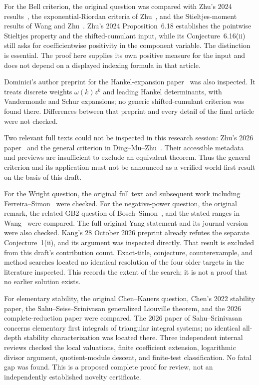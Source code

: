 \documentclass[11pt,a4paper]{article}
\theoremstyle{definition}
\theoremstyle{remark}
\numberwithin{equation}{section}
\begin{document}
For the Bell criterion, the original question was compared with
Zhu's 2024 results~\cite{Zhu2024}, the exponential-Riordan criteria of
Zhu~\cite{Zhu2021}, and the Stieltjes-moment results of Wang and
Zhu~\cite{WangZhu2016}. Zhu's 2024 Proposition~6.18 establishes the
pointwise Stieltjes property and the shifted-cumulant input, while its
Conjecture~6.16(ii) still asks for coefficientwise positivity in the
component variable. The distinction is essential. The proof here supplies
its own positive measure for the input and does not depend on a displayed
indexing formula in that article.

Dominici's author preprint for the Hankel-expansion
paper~\cite{Dominici2020} was also inspected. It treats discrete weights
$\omega(k)z^k$ and leading Hankel determinants, with Vandermonde and Schur
expansions; no generic shifted-cumulant criterion was found there. Differences
between that preprint and every detail of the final article were not checked.

Two relevant full texts could not be inspected in this research session:
Zhu's 2026 paper~\cite{Zhu2026} and the general criterion in
Ding--Mu--Zhu~\cite{DingMuZhu2026}. Their accessible metadata and previews are
insufficient to exclude an equivalent theorem. Thus the general criterion
and its application must not be announced as a verified world-first result
on the basis of this draft.

For the Wright question, the original full text and subsequent work
including Ferreira--Simon~\cite{FerreiraSimon2025} were checked. For the
negative-power question, the original remark, the related GB2 question of
Bosch--Simon~\cite{BoschSimon2015}, and the stated ranges in
Wang~\cite{Wang2024,Wang2026} were compared. The full original Yang
statement and its journal version were also checked. Kang's 28 October
2026 preprint \cite{Kang2026} already refutes the separate
Conjecture~1(ii), and its argument was inspected directly. That result
is excluded from this draft's contribution count. Exact-title,
conjecture, counterexample, and method searches located no identical
resolution of the four older targets in the literature inspected. This records
the extent of the search; it is not a proof that no earlier solution
exists.

For elementary stability, the original Chen--Kauers question,
Chen's 2022 stability paper, the Sahu--Seiss--Srinivasan generalized
Liouville theorem, and the 2026 complete-reduction paper were compared.
The 2026 paper of Sahu--Srinivasan~\cite{stab:SS2026} concerns elementary
first integrals of triangular integral systems; no identical all-depth
stability characterization was located there. Three independent internal
reviews checked the local valuations, finite coefficient extension,
logarithmic divisor argument, quotient-module descent, and finite-test
classification. No fatal gap was found. This is a proposed complete
proof for review, not an independently established novelty certificate.
\end{document}

